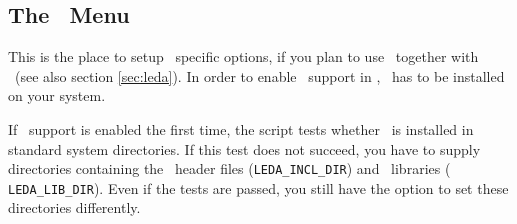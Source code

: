 
\subsection{The \leda\ Menu}\label{sec:leda-menu}

This is the place to setup \leda\ specific options, if you plan to use
\leda\ together with \cgal\ (see also section \ref{sec:leda}). In
order to enable \leda\ support in \cgal, \leda\ has to be installed on
your system.

If \leda\ support is enabled the first time, the script tests whether
\leda\ is installed in standard system directories. If this test does
not succeed, you have to supply directories containing the \leda\ 
header files (\texttt{LEDA\_INCL\_DIR}) and \leda\ libraries ({\tt
  LEDA\_LIB\_DIR}).  Even if the tests are passed, you still have the
option to set these directories differently.\bigskip

